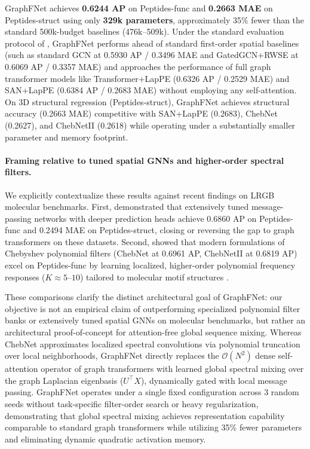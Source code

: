\documentclass[10pt]{article}
\begin{document}
GraphFNet achieves \textbf{0.6244 AP} on Peptides-func and \textbf{0.2663 MAE} on Peptides-struct using only \textbf{329k parameters}, approximately 35\% fewer than the standard 500k-budget baselines (476k--509k). Under the standard evaluation protocol of \citet{dwivedi2022long}, GraphFNet performs ahead of standard first-order spatial baselines (such as standard GCN at 0.5930 AP / 0.3496 MAE and GatedGCN+RWSE at 0.6069 AP / 0.3357 MAE) and approaches the performance of full graph transformer models like Transformer+LapPE (0.6326 AP / 0.2529 MAE) and SAN+LapPE (0.6384 AP / 0.2683 MAE) without employing any self-attention. On 3D structural regression (Peptides-struct), GraphFNet achieves structural accuracy (0.2663 MAE) competitive with SAN+LapPE (0.2683), ChebNet (0.2627), and ChebNetII (0.2618) while operating under a substantially smaller parameter and memory footprint.

\paragraph{Framing relative to tuned spatial GNNs and higher-order spectral filters.}
We explicitly contextualize these results against recent findings on LRGB molecular benchmarks. First, \citet{tonshoff2024where} demonstrated that extensively tuned message-passing networks with deeper prediction heads achieve 0.6860 AP on Peptides-func and 0.2494 MAE on Peptides-struct, closing or reversing the gap to graph transformers on these datasets. Second, \citet{hariri2025returnchebnetunderstandingimproving} showed that modern formulations of Chebyshev polynomial filters (ChebNet at 0.6961 AP, ChebNetII at 0.6819 AP) excel on Peptides-func by learning localized, higher-order polynomial frequency responses ($K \approx 5$--$10$) tailored to molecular motif structures \citep{bamberger2025measuring}.

These comparisons clarify the distinct architectural goal of GraphFNet: our objective is not an empirical claim of outperforming specialized polynomial filter banks or extensively tuned spatial GNNs on molecular benchmarks, but rather an architectural proof-of-concept for attention-free global sequence mixing. Whereas ChebNet approximates localized spectral convolutions via polynomial truncation over local neighborhoods, GraphFNet directly replaces the $\mathcal{O}(N^2)$ dense self-attention operator of graph transformers with learned global spectral mixing over the graph Laplacian eigenbasis ($U^\top X$), dynamically gated with local message passing. GraphFNet operates under a single fixed configuration across 3 random seeds without task-specific filter-order search or heavy regularization, demonstrating that global spectral mixing achieves representation capability comparable to standard graph transformers while utilizing 35\% fewer parameters and eliminating dynamic quadratic activation memory.
\end{document}
